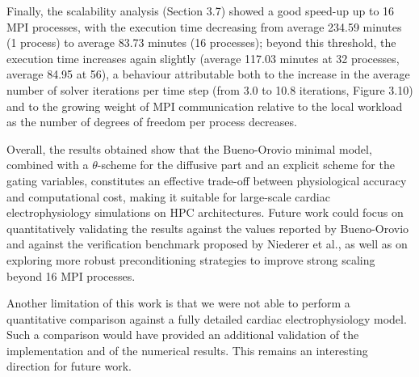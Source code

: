 \documentclass{Configuration_Files/PoliMi3i_thesis}
\begin{document}
Finally, the scalability analysis (Section 3.7) showed a good speed-up up to
16 MPI processes, with the execution time decreasing from average 234.59 minutes (1
process) to average 83.73 minutes (16 processes); beyond this threshold, the
execution time increases again slightly (average 117.03 minutes at 32 processes,
average 84.95 at 56), a behaviour attributable both to the increase in the average
number of solver iterations per time step (from 3.0 to 10.8 iterations,
Figure 3.10) and to the growing weight of MPI communication relative to the
local workload as the number of degrees of freedom per process decreases.

Overall, the results obtained show that the Bueno-Orovio minimal model,
combined with a $\theta$-scheme for the diffusive part and an explicit
scheme for the gating variables, constitutes an effective trade-off between
physiological accuracy and computational cost, making it suitable for
large-scale cardiac electrophysiology simulations on HPC architectures.
Future work could focus on quantitatively validating the results against the
values reported by Bueno-Orovio and against the
verification benchmark proposed by Niederer et al., as well as on exploring
more robust preconditioning strategies to improve strong scaling beyond 16
MPI processes.

Another limitation of this work is that we were not able to perform a quantitative comparison against a fully detailed cardiac electrophysiology model. Such a comparison would have provided an additional validation of the implementation and of the numerical results. This remains an interesting direction for future work.


\end{document}
